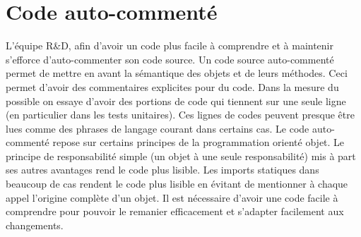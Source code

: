 \section{Code auto-commenté}\label{autoComm}
L'équipe R\&D, afin d'avoir un code plus facile à comprendre et à maintenir s'efforce d'auto-commenter son code source. Un code source auto-commenté permet de mettre en avant la sémantique des objets et de leurs méthodes. Ceci permet d'avoir des commentaires explicites pour du code. Dans la mesure du possible on essaye d'avoir des portions de code qui tiennent sur une seule ligne (en particulier dans les tests unitaires). Ces lignes de codes peuvent presque être lues comme des phrases de langage courant dans certains cas. Le code auto-commenté repose sur certains principes de la programmation orienté objet. Le principe de responsabilité simple (un objet à une seule responsabilité) mis à part ses autres avantages rend le code plus lisible. Les imports statiques dans beaucoup de cas rendent le code plus lisible en évitant de mentionner à chaque appel l'origine complète d'un objet. Il est nécessaire d'avoir une code facile à comprendre pour pouvoir le remanier efficacement et s'adapter facilement aux changements. 

